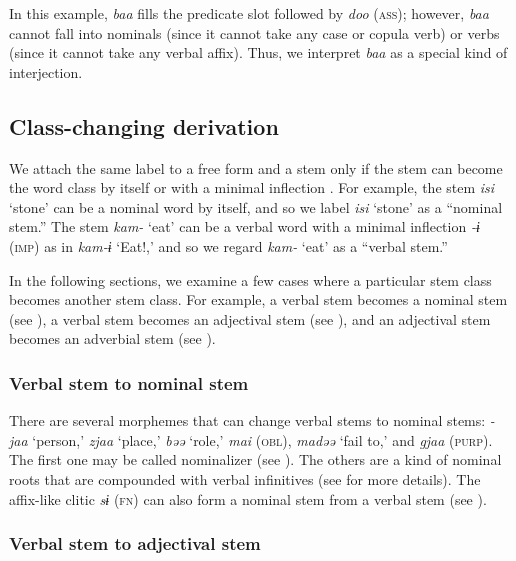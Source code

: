 In this example, \textit{baa} fills the predicate slot followed by \textit{doo} (\textsc{ass}); however, \textit{baa} cannot fall into nominals (since it cannot take any case or copula verb) or verbs (since it cannot take any verbal affix). Thus, we interpret \textit{baa} as a special kind of interjection.

\subsection{Class-changing derivation}\label{sec:4.3.8}

We attach the same label to a free form and a stem only if the stem can become the word class by itself or with a minimal inflection \citep[cf.][8]{Lehmann2008}. For example, the stem \textit{isi} ‘stone’ can be a nominal word by itself, and so we label \textit{isi} ‘stone’ as a “nominal stem.” The stem \textit{kam-} ‘eat’ can be a verbal word with a minimal inflection \textit{{}-ɨ} (\textsc{imp}) as in \textit{kam-ɨ} ‘Eat!,’ and so we regard \textit{kam-} ‘eat’ as a “verbal stem.”

In the following sections, we examine a few cases where a particular stem class becomes another stem class. For example, a verbal stem becomes a nominal stem (see ), a verbal stem becomes an adjectival stem (see ), and an adjectival stem becomes an adverbial stem (see ).

\subsubsection{Verbal stem to nominal stem}\label{sec:4.3.8.1}

There are several morphemes that can change verbal stems to nominal stems: \textit{{}-jaa} ‘person,’ \textit{zjaa} ‘place,’ \textit{bəə} ‘role,’ \textit{mai} (\textsc{obl}), \textit{madəə} ‘fail to,’ and \textit{gjaa} (\textsc{purp}). The first one may be called nominalizer (see ). The others are a kind of nominal roots that are compounded with verbal infinitives (see  for more details). The affix-like clitic \textit{sɨ} (\textsc{fn}) can also form a nominal stem from a verbal stem (see ).

\subsubsection{Verbal stem to adjectival stem}\label{sec:4.3.8.2}

